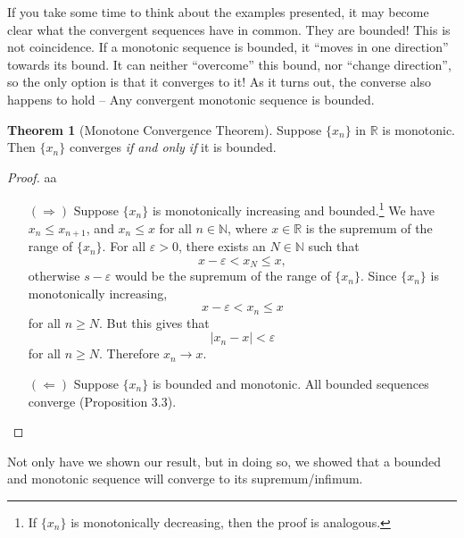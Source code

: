 \documentclass{article}
\newcommand{\N}{\mathbb{N}}
\newcommand{\R}{\mathbb{R}}
\theoremstyle{definition}
\newtheorem{theorem}{Theorem}[section]
\begin{document}
	If you take some time to think about the examples presented, it may become clear what the convergent sequences have in common. They are bounded! This is not coincidence. If a monotonic sequence is bounded, it ``moves in one direction'' towards its bound. It can neither ``overcome'' this bound, nor ``change direction'', so the only option is that it converges to it! As it turns out, the converse also happens to hold -- Any convergent monotonic sequence is bounded.  
	\begin{theorem}[Monotone Convergence Theorem]
		Suppose $ \{x_n\} $ in $ \R $ is monotonic. Then $ \{x_n\} $ converges \textit{if and only if} it is bounded.
	\end{theorem}
	\begin{proof}{\color{white}aa}
		\begin{enumerate}
			\item [$ (\Longrightarrow) $] Suppose $ \{x_n\} $ is monotonically increasing and bounded.\footnote{If $ \{x_n\} $ is monotonically decreasing, then the proof is analogous.} We have $ x_n\le x_{n+1} $, and $ x_n\le x $ for all $ n\in\N $, where $ x\in\R $ is the supremum of the range of $ \{x_n\} $.  For all $ \varepsilon>0 $, there exists an $ N\in\N $ such that $$x-\varepsilon<x_N\le x, $$ otherwise $ s-\varepsilon $ would be the supremum of the range of $ \{x_n\} $. Since $ \{x_n\} $ is monotonically increasing, $$ x-\varepsilon<x_n\le x $$ for all $ n\ge N $. But this gives that $$|x_n-x|<\varepsilon $$ for all $ n\ge N $. Therefore $ x_n\to x $. 
			\item [$ (\Longleftarrow) $] Suppose $ \{x_n\} $ is bounded and monotonic. All bounded sequences converge (Proposition 3.3).
		\end{enumerate}
	\end{proof}
	Not only have we shown our result, but in doing so, we showed that a bounded and monotonic sequence will converge to its supremum/infimum. 
	
\end{document}
